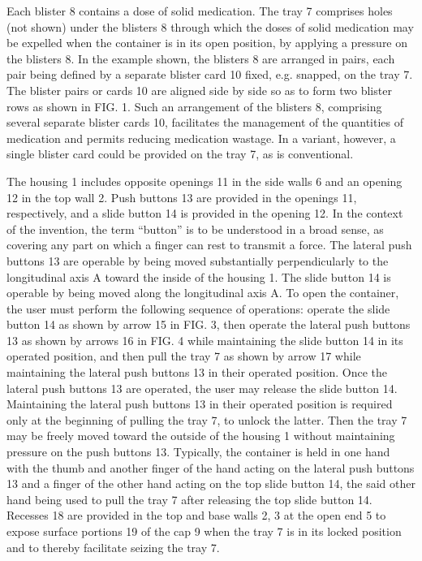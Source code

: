 \documentclass[11pt,a4paper]{article}
\begin{document}
Each blister 8 contains a dose of solid medication. The tray 7 comprises holes (not shown) under the blisters 8 through which the doses of solid medication may be expelled when the container is in its open position, by applying a pressure on the blisters 8. In the example shown, the blisters 8 are arranged in pairs, each pair being defined by a separate blister card 10 fixed, e.g. snapped, on the tray 7. The blister pairs or cards 10 are aligned side by side so as to form two blister rows as shown in FIG. 1. Such an arrangement of the blisters 8, comprising several separate blister cards 10, facilitates the management of the quantities of medication and permits reducing medication wastage. In a variant, however, a single blister card could be provided on the tray 7, as is conventional.

The housing 1 includes opposite openings 11 in the side walls 6 and an opening 12 in the top wall 2. Push buttons 13 are provided in the openings 11, respectively, and a slide button 14 is provided in the opening 12. In the context of the invention, the term “button” is to be understood in a broad sense, as covering any part on which a finger can rest to transmit a force. The lateral push buttons 13 are operable by being moved substantially perpendicularly to the longitudinal axis A toward the inside of the housing 1. The slide button 14 is operable by being moved along the longitudinal axis A. To open the container, the user must perform the following sequence of operations: operate the slide button 14 as shown by arrow 15 in FIG. 3, then operate the lateral push buttons 13 as shown by arrows 16 in FIG. 4 while maintaining the slide button 14 in its operated position, and then pull the tray 7 as shown by arrow 17 while maintaining the lateral push buttons 13 in their operated position. Once the lateral push buttons 13 are operated, the user may release the slide button 14. Maintaining the lateral push buttons 13 in their operated position is required only at the beginning of pulling the tray 7, to unlock the latter. Then the tray 7 may be freely moved toward the outside of the housing 1 without maintaining pressure on the push buttons 13. Typically, the container is held in one hand with the thumb and another finger of the hand acting on the lateral push buttons 13 and a finger of the other hand acting on the top slide button 14, the said other hand being used to pull the tray 7 after releasing the top slide button 14. Recesses 18 are provided in the top and base walls 2, 3 at the open end 5 to expose surface portions 19 of the cap 9 when the tray 7 is in its locked position and to thereby facilitate seizing the tray 7.
\end{document}
